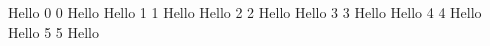 \documentclass[12pt]{article}
\begin{document}
Hello 0
0 Hello
\newpage
Hello 1
1 Hello
\newpage
Hello 2
2 Hello
\newpage
Hello 3
3 Hello
\newpage
Hello 4
4 Hello
\newpage
Hello 5
5 Hello
\newpage
\end{document}
